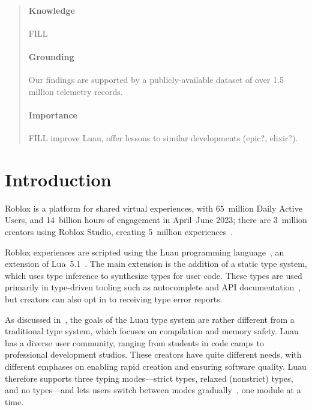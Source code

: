 \documentclass[english,submission,cleveref]{programming}
\begin{document}
\begin{abstract}
  \paragraph{Knowledge}
  FILL

  \paragraph{Grounding}
  Our findings are supported by a publicly-available dataset
  of over 1.5 million telemetry records.

  \paragraph{Importance}
  FILL improve Luau, offer lessons to similar developments (epic?, elixir?).

\end{abstract}

\section{Introduction}
\label{s:introduction}

{Roblox} is a platform for {shared virtual experiences}, with
65~million Daily Active Users, and 14~billion hours of engagement in
April--June 2023; there are 3~million creators using {Roblox Studio},
creating 5~million experiences~\cite{corp.roblox.com}.

{Roblox experiences} are scripted using the 
{Luau} programming language~\cite{luau-lang.org},
an extension of {Lua~5.1~\cite{lua}}.
The main extension is the addition of a static type system, which uses
type inference to synthesize types for user code. These types
are used primarily in type-driven tooling such as autocomplete
and API documentation~\cite{luau-autocomplete},
but creators can also opt in to receiving type error reports.

As discussed in~\cite{bfj-hatra-2021},
the goals of the {Luau} type system are rather different from
a traditional type system, which focuses on compilation and memory safety.
{Luau} has a diverse user community, ranging from
students in code camps to professional development studios. These
creators have quite different needs, with different emphases on
enabling rapid creation and ensuring software quality.
{Luau} therefore supports three typing modes---strict types,
relaxed (nonstrict) types, and no types---and lets users switch
between modes gradually~\cite{st-sfp-2006,tfffgksst-snapl-2017}, one module at a time.
\end{document}
